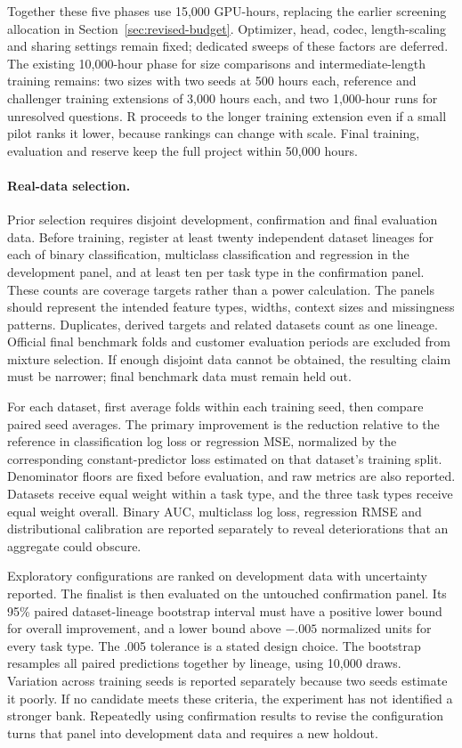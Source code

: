 \documentclass[11pt]{article}
\begin{document}
Together these five phases use 15,000 GPU-hours, replacing the earlier screening allocation in Section~\ref{sec:revised-budget}. Optimizer, head, codec, length-scaling and sharing settings remain fixed; dedicated sweeps of these factors are deferred. The existing 10,000-hour phase for size comparisons and intermediate-length training remains: two sizes with two seeds at 500 hours each, reference and challenger training extensions of 3,000 hours each, and two 1,000-hour runs for unresolved questions. R proceeds to the longer training extension even if a small pilot ranks it lower, because rankings can change with scale. Final training, evaluation and reserve keep the full project within 50,000 hours.

\paragraph{Real-data selection.}
Prior selection requires disjoint development, confirmation and final evaluation data. Before training, register at least twenty independent dataset lineages for each of binary classification, multiclass classification and regression in the development panel, and at least ten per task type in the confirmation panel. These counts are coverage targets rather than a power calculation. The panels should represent the intended feature types, widths, context sizes and missingness patterns. Duplicates, derived targets and related datasets count as one lineage. Official final benchmark folds and customer evaluation periods are excluded from mixture selection. If enough disjoint data cannot be obtained, the resulting claim must be narrower; final benchmark data must remain held out.

For each dataset, first average folds within each training seed, then compare paired seed averages. The primary improvement is the reduction relative to the reference in classification log loss or regression MSE, normalized by the corresponding constant-predictor loss estimated on that dataset's training split. Denominator floors are fixed before evaluation, and raw metrics are also reported. Datasets receive equal weight within a task type, and the three task types receive equal weight overall. Binary AUC, multiclass log loss, regression RMSE and distributional calibration are reported separately to reveal deteriorations that an aggregate could obscure.

Exploratory configurations are ranked on development data with uncertainty reported. The finalist is then evaluated on the untouched confirmation panel. Its 95\% paired dataset-lineage bootstrap interval must have a positive lower bound for overall improvement, and a lower bound above $-.005$ normalized units for every task type. The .005 tolerance is a stated design choice. The bootstrap resamples all paired predictions together by lineage, using 10,000 draws. Variation across training seeds is reported separately because two seeds estimate it poorly. If no candidate meets these criteria, the experiment has not identified a stronger bank. Repeatedly using confirmation results to revise the configuration turns that panel into development data and requires a new holdout.
\end{document}
